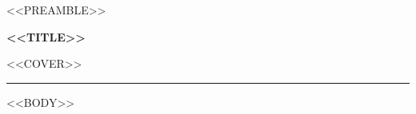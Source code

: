 <<PREAMBLE>>



{\Large\bfseries <<TITLE>>\par}
\smallskip
<<COVER>>\par
\medskip
{\color{gray}\hrule}

<<BODY>>



